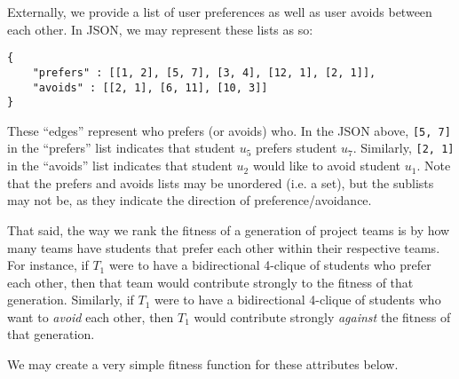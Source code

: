 \documentclass[11pt]{article}
\begin{document}
Externally, we provide a list of user preferences as well as user avoids between each other. In JSON, we may represent these lists as so:

\begin{verbatim}
{
	"prefers" : [[1, 2], [5, 7], [3, 4], [12, 1], [2, 1]],
	"avoids" : [[2, 1], [6, 11], [10, 3]]
}
\end{verbatim}

These ``edges'' represent who prefers (or avoids) who. In the JSON above, \verb|[5, 7]| in the ``prefers'' list indicates that student $u_5$ prefers student $u_7$. Similarly, \verb|[2, 1]| in the ``avoids'' list indicates that student $u_2$ would like to avoid student $u_1$. Note that the prefers and avoids lists may be unordered (i.e. a set), but the sublists may not be, as they indicate the direction of preference/avoidance.

That said, the way we rank the fitness of a generation of project teams is by how many teams have students that prefer each other within their respective teams. For instance, if $T_1$ were to have a bidirectional 4-clique of students who prefer each other, then that team would contribute strongly to the fitness of that generation. Similarly, if $T_1$ were to have a bidirectional 4-clique of students who want to \textit{avoid} each other, then $T_1$ would contribute strongly \textit{against} the fitness of that generation.

We may create a very simple fitness function for these attributes below.
\end{document}
